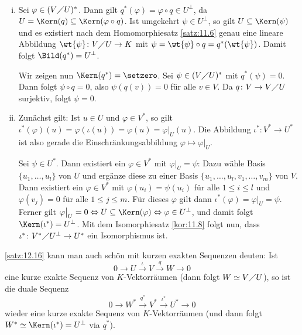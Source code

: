 \begin{beweis}
	\mbox{} \\[-.9cm]
	\begin{enumerate}[(i)]
		\item Sei $\varphi \in (V \diagup U)^*$.
		Dann gilt $q^*(\varphi) = \varphi \circ q \in U^\perp$, da $U = \Kern(q) \subseteq \Kern(\varphi \circ q)$.
		Ist umgekehrt $\psi \in U^\perp$, so gilt $U \subseteq \Kern(\psi)$ und es existiert nach dem Homomorphiesatz \ref{satz:11.6} genau eine lineare Abbildung $\wt{\psi} \colon V \diagup U \rightarrow K$ mit $\psi = \wt{\psi} \circ q = q^*(\wt{\psi})$.
		Damit folgt $\Bild(q^*) = U^\perp$.
		
		Wir zeigen nun $\Kern(q^*) = \setzero$.
		Sei $\psi \in (V \diagup U)^*$ mit $q^*(\psi) = 0$.
		Dann folgt $\psi \circ q = 0$, also $\psi(q(v))=0$ für alle $v \in V$.
		Da $q \colon V \rightarrow V \diagup U$ surjektiv, folgt $\psi = 0$.
		\item Zunächst gilt: Ist $u \in U$ und $\varphi \in V^*$, so gilt $\iota^*(\varphi)(u) = \varphi(\iota(u)) = \varphi(u) = \varphi \big|_{U}(u)$.
		Die Abbildung $\iota^* \colon V^* \rightarrow U^*$ ist also gerade die Einschränkungsabbildung $\varphi \mapsto \varphi \big|_U$.
		
		Sei $\psi \in U^*$.
		Dann existiert ein $\varphi \in V^*$ mit $\varphi \big|_U = \psi$:
		Dazu wähle Basis $\{u_1,\dots,u_l\}$ von $U$ und ergänze diese zu einer Basis $\{u_1,\dots,u_l,v_1,\dots,v_m\}$ von $V$.
		Dann existiert ein $\varphi \in V^*$ mit $\varphi(u_i) = \psi(u_i)$ für alle $1 \leq i \leq l$ und $\varphi(v_j) = 0$ für alle $1 \leq j \leq m$.
		Für dieses $\varphi$ gilt dann $\iota^*(\varphi) = \varphi \big|_U = \psi$.
		Ferner gilt $\varphi \big|_U = 0 \Leftrightarrow U \subseteq \Kern(\varphi) \Leftrightarrow \varphi \in U^\perp$, und damit folgt $\Kern(\iota^*) = U^\perp$.
		Mit dem Isomorphiesatz \ref{kor:11.8} folgt nun, dass $\iota^*\colon V^* \diagup U^\perp \rightarrow U^*$ ein Isomorphismus ist. 
	\end{enumerate}
\end{beweis}

\begin{bemerkung}
	\label{bem:12.17}
	\autoref{satz:12.16} kann man auch schön mit kurzen exakten Sequenzen deuten:
	Ist
	\[
		0 \rightarrow U \xrightarrow{\iota} V \xrightarrow{q} W \rightarrow 0
	\]
	eine kurze exakte Sequenz von $K$-Vektorräumen (dann folgt $W \simeq V \diagup U$), so ist die duale Sequenz
	\[
		0 \rightarrow W^* \xrightarrow{q^*} V^* \xrightarrow{\iota^*} U^* \rightarrow 0
	\]
	wieder eine kurze exakte Sequenz von $K$-Vektorräumen (und dann folgt $W^* \simeq \Kern(\iota^*) = U^\perp$ via $q^*$).
\end{bemerkung}

